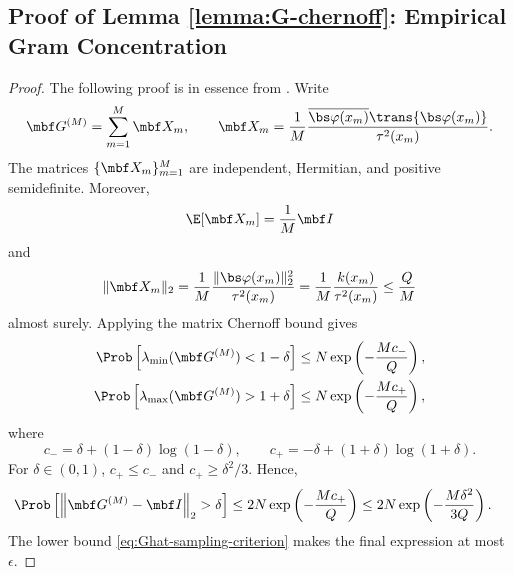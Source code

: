 \documentclass[10pt,dvipsnames]{amsart}
\begin{document}
\subsection{Proof of Lemma \ref{lemma:G-chernoff}: Empirical Gram Concentration}
\label{app:G-chernoff}
\gramianConcentration*
\begin{proof}
  The following proof is in essence from \cite{cohen_stability_2013,cohen_optimal_2017}. Write
    \begin{align}
        \label{eq:GM-summands}
        \mbf G^{(M)}
        =
        \sum_{m=1}^M \mbf X_m,
        \qquad
        \mbf X_m
        =
        \frac{1}{M}
        \frac{
            \overline{\bs\varphi(x_m)}
            \trans{\bs\varphi(x_m)}
        }{\tau^2(x_m)} .
    \end{align}
    The matrices \(\{\mbf X_m\}_{m=1}^M\) are independent, Hermitian, and
    positive semidefinite.  Moreover,
    \[
        \E[\mbf X_m]=\frac{1}{M}\mbf I
    \]
    and
    \[
        \|\mbf X_m\|_2
        =
        \frac{1}{M}
        \frac{\|\bs\varphi(x_m)\|_2^2}{\tau^2(x_m)}
        =
        \frac{1}{M}
        \frac{k(x_m)}{\tau^2(x_m)}
        \leq
        \frac{Q}{M}
    \]
    almost surely.  Applying the matrix Chernoff bound
    \cite[Theorem~1.1]{tropp_user-friendly_2012} gives
    \begin{align*}
        \Prob\left[
            \lambda_{\min}(\mbf G^{(M)})<1-\delta
        \right]
        &\leq
        N\exp\left(-\frac{M c_-}{Q}\right),\\
        \Prob\left[
            \lambda_{\max}(\mbf G^{(M)})>1+\delta
        \right]
        &\leq
        N\exp\left(-\frac{M c_+}{Q}\right),
    \end{align*}
    where
    \[
        c_-
        =
        \delta+(1-\delta)\log(1-\delta),
        \qquad
        c_+
        =
        -\delta+(1+\delta)\log(1+\delta).
    \]
    For \(\delta\in(0,1)\), \(c_+\leq c_-\) and
    \(c_+\ge \delta^2/3\).  Hence,
    \begin{align*}
        \Prob\left[
            \left\|\mbf G^{(M)}-\mbf I\right\|_2>\delta
        \right]
        &\leq
        2N\exp\left(-\frac{M c_+}{Q}\right)
        \leq
        2N\exp\left(-\frac{M\delta^2}{3Q}\right).
    \end{align*}
    The lower bound \eqref{eq:Ghat-sampling-criterion} makes the final
    expression at most \(\epsilon\).
\end{proof}
\end{document}
